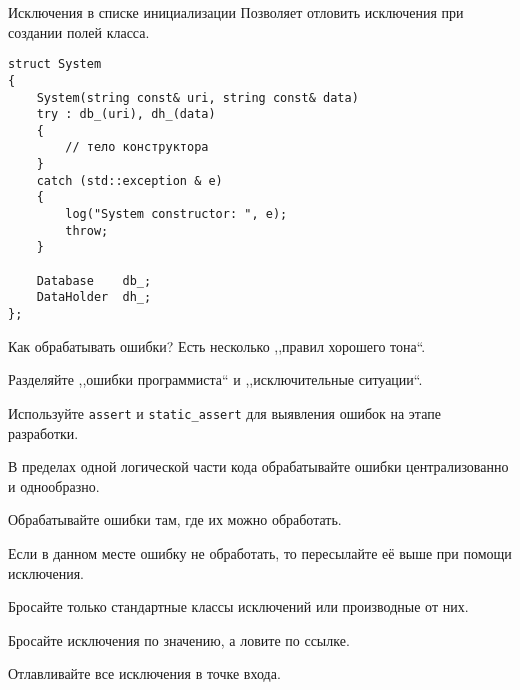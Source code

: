 \documentclass{beamer}
\begin{document}
\begin{frame}[fragile]{Исключения в списке инициализации}
Позволяет отловить исключения при создании полей класса.
\begin{lstlisting}
struct System 
{
    System(string const& uri, string const& data)
    try : db_(uri), dh_(data)
    {
        // тело конструктора
    }
    catch (std::exception & e) 
    {
        log("System constructor: ", e);
        throw;
    }
    
    Database    db_;
    DataHolder  dh_;
};   
\end{lstlisting}
\end{frame}


\begin{frame}[fragile]{Как обрабатывать ошибки?}
    Есть несколько ,,правил хорошего тона``.
    
        \fakeitem Разделяйте ,,ошибки программиста``
            и ,,исключительные ситуации``.
            
        \fakeitem Используйте \texttt{assert} и \texttt{static\_assert} 
        для выявления ошибок на этапе разработки.
        
        \fakeitem В пределах одной логической части кода 
        обрабатывайте ошибки централизованно и однообразно.

        \fakeitem Обрабатывайте ошибки там, где их можно обработать.
        
        \fakeitem Если в данном месте ошибку не обработать, то
             пересылайте её выше при помощи исключения.
 
        \fakeitem Бросайте только стандартные классы исключений или производные от них.

        \fakeitem Бросайте исключения по значению, а ловите по ссылке.

        \fakeitem Отлавливайте все исключения в точке входа.
           



\end{frame}
\end{document}
